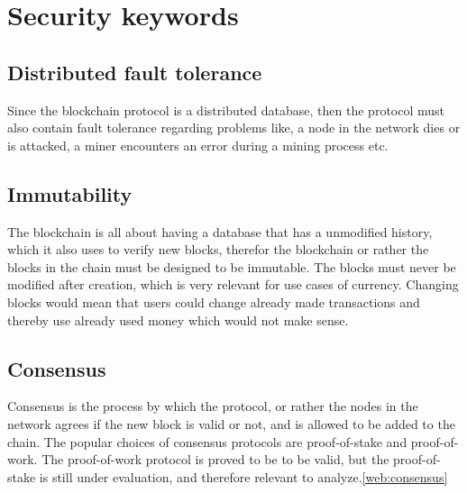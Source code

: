 
\section{Security keywords}

\subsection{Distributed fault tolerance}
Since the blockchain protocol is a distributed database, then the protocol must also contain fault tolerance regarding problems like, a node in the network dies or is attacked, a miner encounters an error during a mining process etc.

\subsection{Immutability}
The blockchain is all about having a database that has a unmodified history, which it also uses to verify new blocks, therefor the blockchain or rather the blocks in the chain must be designed to be immutable. The blocks must never be modified after creation, which is very relevant for use cases of currency. Changing blocks would mean that users could change already made transactions and thereby use already used money which would not make sense.

\subsection{Consensus}
Consensus is the process by which the protocol, or rather the nodes in the network agrees if the new block is valid or not, and is allowed to be added to the chain. The popular choices of consensus protocols are proof-of-stake and proof-of-work. The proof-of-work protocol is proved to be to be valid, but the proof-of-stake is still under evaluation, and therefore relevant to analyze.\ref{web:consensus}

